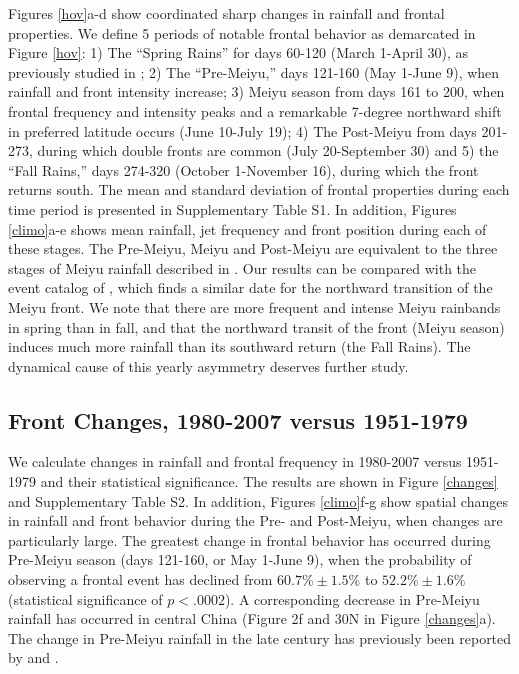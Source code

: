 \documentclass[draft,grl]{AGUTeX}
\begin{document}
\begin{article}
	Figures \ref{hov}a-d show coordinated sharp changes in rainfall and frontal properties. We define 5 periods of notable frontal behavior as demarcated in Figure \ref{hov}: 1) The ``Spring Rains'' for days 60-120 (March 1-April 30), as previously studied in \citet{Tian1998}; 2) The ``Pre-Meiyu,'' days 121-160 (May 1-June 9), when rainfall and front intensity increase; 3) Meiyu season from days 161 to 200, when frontal frequency and intensity peaks and a remarkable 7-degree northward shift in preferred latitude occurs (June 10-July 19); 4) The Post-Meiyu from days 201-273, during which double fronts are common (July 20-September 30) and 5) the ``Fall Rains,'' days 274-320 (October 1-November 16), during which the front returns south. The mean and standard deviation of frontal properties during each time period is presented in Supplementary Table S1. In addition, Figures \ref{climo}a-e shows mean rainfall, jet frequency and front position during each of these stages. The Pre-Meiyu, Meiyu and Post-Meiyu are equivalent to the three stages of Meiyu rainfall described in \citet{Ding2005}. Our results can be compared with the event catalog of \citet{Xu2009}, which finds a similar date for the northward transition of the Meiyu front. We note that there are more frequent and intense Meiyu rainbands in spring than in fall, and that the northward transit of the front (Meiyu season) induces much more rainfall than its southward return (the Fall Rains). The dynamical cause of this yearly asymmetry deserves further study.
		
\subsection{Front Changes, 1980-2007 versus 1951-1979}
	
	We calculate changes in rainfall and frontal frequency in 1980-2007 versus 1951-1979 and their statistical significance. The results are shown in Figure \ref{changes} and Supplementary Table S2. In addition, Figures \ref{climo}f-g show spatial changes in rainfall and front behavior during the Pre- and Post-Meiyu, when changes are particularly large. The greatest change in frontal behavior has occurred during Pre-Meiyu season (days 121-160, or May 1-June 9), when the probability of observing a frontal event has declined from $60.7\% \pm 1.5\%$ to $52.2\% \pm 1.6\%$ (statistical significance of $p < .0002$). A corresponding decrease in Pre-Meiyu rainfall has occurred in central China (Figure 2f and 30\textdegree N in Figure \ref{changes}a). The change in Pre-Meiyu rainfall in the late  century has previously been reported by \citet{Xin2006} and \citet{Wang2009}.
		

\end{article}
\end{document}
